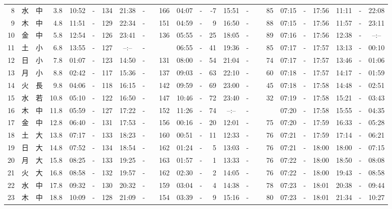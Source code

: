 \documentclass[12pt,a4j]{jsarticle}
\begin{document}
\begin{table}[htbp]
\begin{center}
{\begin{tabular}{|rc|cr|ccrccr|ccrccr|ccc|ccc|}
 8 & 水 & 中 &  3.8 &  10:52 &-& 134 &  21:38 &-& 166 &  04:07 &-&  -7 &  15:51 &-&  85 & 07:15 & -& 17:56 & 11:11 & -& 22:08 \\
 9 & 木 & 中 &  4.8 &  11:51 &-& 129 &  22:34 &-& 151 &  04:59 &-&   9 &  16:50 &-&  88 & 07:15 & -& 17:56 & 11:57 & -& 23:11 \\
10 & 金 & 中 &  5.8 &  12:54 &-& 126 &  23:41 &-& 136 &  05:55 &-&  25 &  18:05 &-&  89 & 07:16 & -& 17:56 & 12:38 & -& --:-- \\
11 & 土 & 小 &  6.8 &  13:55 &-& 127 &  --:-- &-&~~~~~ &  06:55 &-&  41 &  19:36 &-&  85 & 07:17 & -& 17:57 & 13:13 & -& 00:10 \\
12 & 日 & 小 &  7.8 &  01:07 &-& 123 &  14:50 &-& 131 &  08:00 &-&  54 &  21:04 &-&  74 & 07:17 & -& 17:57 & 13:46 & -& 01:06 \\
13 & 月 & 小 &  8.8 &  02:42 &-& 117 &  15:36 &-& 137 &  09:03 &-&  63 &  22:10 &-&  60 & 07:18 & -& 17:57 & 14:17 & -& 01:59 \\
14 & 火 & 長 &  9.8 &  04:06 &-& 118 &  16:15 &-& 142 &  09:59 &-&  69 &  23:00 &-&  45 & 07:18 & -& 17:58 & 14:48 & -& 02:51 \\
15 & 水 & 若 & 10.8 &  05:10 &-& 122 &  16:50 &-& 147 &  10:46 &-&  72 &  23:40 &-&  32 & 07:19 & -& 17:58 & 15:21 & -& 03:43 \\
16 & 木 & 中 & 11.8 &  05:59 &-& 127 &  17:22 &-& 152 &  11:26 &-&  74 &  --:-- &-&~~~~~ & 07:20 & -& 17:58 & 15:55 & -& 04:35 \\
17 & 金 & 中 & 12.8 &  06:40 &-& 131 &  17:53 &-& 156 &  00:16 &-&  20 &  12:01 &-&  75 & 07:20 & -& 17:59 & 16:33 & -& 05:28 \\
18 & 土 & 大 & 13.8 &  07:17 &-& 133 &  18:23 &-& 160 &  00:51 &-&  11 &  12:33 &-&  76 & 07:21 & -& 17:59 & 17:14 & -& 06:21 \\
19 & 日 & 大 & 14.8 &  07:52 &-& 134 &  18:54 &-& 162 &  01:24 &-&   5 &  13:03 &-&  76 & 07:21 & -& 18:00 & 18:00 & -& 07:15 \\
20 & 月 & 大 & 15.8 &  08:25 &-& 133 &  19:25 &-& 163 &  01:57 &-&   1 &  13:33 &-&  76 & 07:22 & -& 18:00 & 18:50 & -& 08:08 \\
21 & 火 & 大 & 16.8 &  08:58 &-& 132 &  19:57 &-& 162 &  02:30 &-&   2 &  14:05 &-&  76 & 07:22 & -& 18:00 & 19:43 & -& 08:58 \\
22 & 水 & 中 & 17.8 &  09:32 &-& 130 &  20:32 &-& 159 &  03:04 &-&   4 &  14:38 &-&  78 & 07:23 & -& 18:01 & 20:38 & -& 09:44 \\
23 & 木 & 中 & 18.8 &  10:09 &-& 128 &  21:09 &-& 154 &  03:39 &-&   9 &  15:16 &-&  80 & 07:23 & -& 18:01 & 21:34 & -& 10:27 \\

\end{tabular}}
\end{center}
\end{table}
\end{document}
